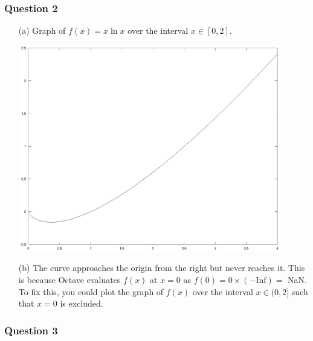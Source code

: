 \documentclass[11pt,a4paper]{article}
\begin{document}
\subsubsection*{Question 2}
\begin{enumerate}

	\item[(a)] Graph of $f(x)=x\ln x$ over the interval $x \in [0,2]$.
	\begin{center}
		\includegraphics[width=0.9\textwidth]{plot2.eps}
	\end{center}
	
	\item[(b)] The curve approaches the origin from the right but never reaches it. This is because Octave evaluates $f(x)$ at $x=0$ as $f(0)= 0 \times (-\text{Inf})=$ NaN. To fix this, you could plot the graph of $f(x)$ over the interval $x \in (0,2]$ such that $x=0$ is excluded.
	
\end{enumerate}

\pagebreak

\subsubsection*{Question 3}
\end{document}
